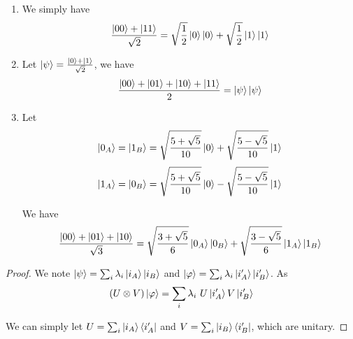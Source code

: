 \documentclass[../main.tex]{subfiles}
\begin{document}
\begin{exercise}
\end{exercise}
\begin{enumerate}
    \item We simply have
    \begin{equation*}
        \frac{\ket{00}+\ket{11}}{\sqrt{2}}=\sqrt{\frac{1}{2}}\ket{0}\ket{0}+\sqrt{\frac{1}{2}}\ket{1}\ket{1}
    \end{equation*}
    
    \item Let $\ket{\psi}=\frac{\ket{0}+\ket{1}}{\sqrt{2}}$, we have
    \begin{equation*}
        \frac{\ket{00}+\ket{01}+\ket{10}+\ket{11}}{2}=\ket{\psi}\ket{\psi}
    \end{equation*}
    
    \item Let
    \begin{equation*}
        \ket{0_A}=\ket{1_B}=\sqrt{\frac{5+\sqrt{5}}{10}}\ket{0}+\sqrt{\frac{5-\sqrt{5}}{10}}\ket{1}
    \end{equation*}
    \begin{equation*}
        \ket{1_A}=\ket{0_B}=\sqrt{\frac{5+\sqrt{5}}{10}}\ket{0}-\sqrt{\frac{5-\sqrt{5}}{10}}\ket{1}
    \end{equation*}
    
    We have
    \begin{equation*}
        \frac{\ket{00}+\ket{01}+\ket{10}}{\sqrt{3}}=\sqrt{\frac{3+\sqrt{5}}{6}}\ket{0_A}\ket{0_B}+\sqrt{\frac{3-\sqrt{5}}{6}}\ket{1_A}\ket{1_B}
    \end{equation*}
\end{enumerate}

\bigskip
\begin{exercise}
\end{exercise}
\begin{proof}
    We note $\ket{\psi}=\sum_i \lambda_i\ket{i_A}\ket{i_B}$ and $\ket{\varphi}=\sum_i \lambda_i\ket{i^\prime_A}\ket{i^\prime_B}$. As
    \begin{equation*}
        (U\otimes V)\ket{\varphi}=\sum_i \lambda_i\ U\ket{i^\prime_A} V\ket{i^\prime_B}
    \end{equation*}
    
    We can simply let $U=\sum_i \ket{i_A}\bra{i^\prime_A}$ and $V=\sum_i \ket{i_B}\bra{i^\prime_B}$, which are unitary.
\end{proof}
\end{document}
